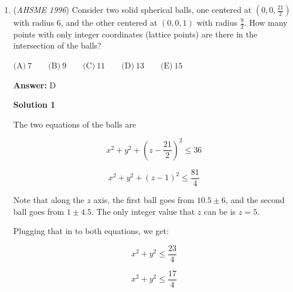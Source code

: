 \begin{enumerate}
 These are all the "linking equations" that are needed; the transitive property of equality makes the other three equalities unnecessary.

 From the first equation, we know that $r$ must be $3$ more than a multiple of $4$, or that $r \equiv 3 \mod 4$

 Putting the first equation into the second equation, we find $r-2 = 3b$.  Therefore, $r \equiv 2 \mod 3$.  Using the \href{https://artofproblemsolving.com/wiki/index.php?title=Chinese\_Remainder\_Theorem}{Chinese Remainder Theorem}, we find that $r \equiv 11 \mod 12$.

 The third equation gives no new restrictions on $r$; it is already odd by the first equation.  

 Thus, the minimal positive value of $r$ is $11$.  This requires $g=\frac{r - 1}{2} = 5$ by the third equation, and $w = \frac{r-3}{4} = 2$ by the first equation.  Finally, the second equation gives $b = \frac{(r-3)(r-2)}{12w} = 3$.

 The minimal total number of marbles is $11 + 5 + 2 + 3 = \boxed{21}$, which is option $\boxed{B}$.

 


	\item (\textit{AHSME 1996}) Consider two solid spherical balls, one centered at $(0, 0,\frac{21}{2})$ with radius $6$, and the other centered at $(0, 0, 1)$ with radius $\frac{9}{2}$. How many points with only integer coordinates (lattice points) are there in the intersection of the balls? 


 $\text{(A)}\ 7\qquad\text{(B)}\ 9\qquad\text{(C)}\ 11\qquad\text{(D)}\ 13\qquad\text{(E)}\ 15$

 \textbf{Answer: }D



\textbf{Solution 1}

The two equations of the balls are

 
 \[x^2 + y^2 + \left(z - \frac{21}{2}\right)^2 \le 36\]

 \[x^2 + y^2 + (z - 1)^2 \le \frac{81}{4}\]

 Note that along the $z$ axis, the first ball goes from $10.5 \pm 6$, and the second ball goes from $1 \pm 4.5$.  The only integer value that $z$ can be is $z=5$.

 Plugging that in to both equations, we get:

 
 \[x^2 + y^2 \le \frac{23}{4}\]

 \[x^2 + y^2 \le \frac{17}{4}\]


\end{enumerate}
